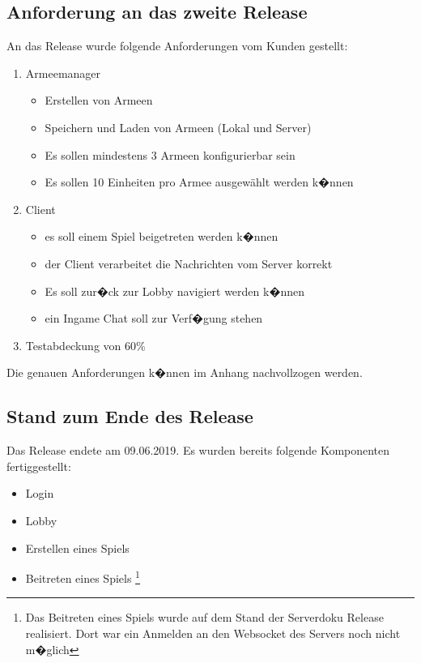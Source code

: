 \documentclass[12pt, titlepage]{scrartcl}
\newcommand{\RN}[1]{%
	\textup{\uppercase\expandafter{\romannumeral#1}}%
}
\begin{document}
		\subsection{Anforderung an das zweite Release}
			An das Release wurde folgende Anforderungen vom Kunden gestellt:
			\begin{enumerate}
				\item Armeemanager
				\begin{itemize}
					\item Erstellen von Armeen 
					\item Speichern und Laden von Armeen (Lokal und Server)
					\item Es sollen mindestens 3 Armeen konfigurierbar sein
					\item Es sollen 10 Einheiten pro Armee ausgew\"ahlt werden k�nnen
				\end{itemize}
				\item Client
					\begin{itemize}
						\item es soll einem Spiel beigetreten werden k�nnen
						\item der Client verarbeitet die Nachrichten vom Server korrekt
						\item Es soll zur�ck zur Lobby navigiert werden k�nnen
						\item ein Ingame Chat soll zur Verf�gung stehen
					\end{itemize}
				\item Testabdeckung von 60\%
			\end{enumerate}
		Die genauen Anforderungen k�nnen im Anhang %
		nachvollzogen werden.
		
		\subsection{Stand zum Ende des Release \RN{1}}
		Das Release \RN{1} endete am 09.06.2019. Es wurden bereits folgende Komponenten fertiggestellt:
		\begin{itemize}
			\item Login
			\item Lobby
			\item Erstellen eines Spiels
			\item Beitreten eines Spiels \footnote{Das Beitreten eines Spiels wurde auf dem Stand der Serverdoku Release \RN{1} realisiert. Dort war ein Anmelden an den Websocket des Servers noch nicht m�glich}
		\end{itemize}
\end{document}
